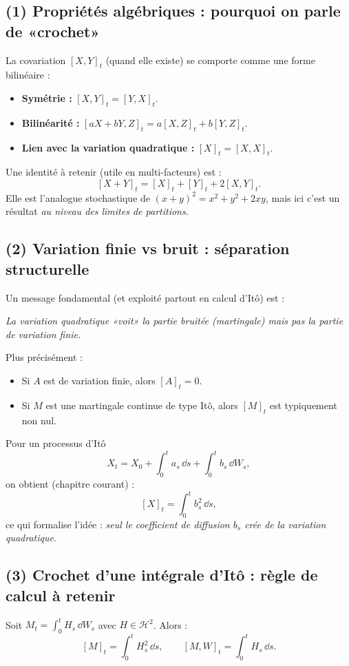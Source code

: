 
\subsection*{(1) Propriétés algébriques : pourquoi on parle de «crochet»}
La covariation $[X,Y]_t$ (quand elle existe) se comporte comme une forme bilinéaire :
\begin{itemize}[leftmargin=*]
\item \textbf{Symétrie :} $[X,Y]_t=[Y,X]_t$.
\item \textbf{Bilinéarité :} $[aX+bY,Z]_t=a[X,Z]_t+b[Y,Z]_t$.
\item \textbf{Lien avec la variation quadratique :} $[X]_t=[X,X]_t$.
\end{itemize}
Une identité à retenir (utile en multi-facteurs) est :
\[
[X+Y]_t=[X]_t+[Y]_t+2[X,Y]_t.
\]
Elle est l'analogue stochastique de $(x+y)^2=x^2+y^2+2xy$, mais ici c'est un résultat \emph{au niveau des limites de partitions}.

\subsection*{(2) Variation finie vs bruit : séparation structurelle}
Un message fondamental (et exploité partout en calcul d'Itô) est :
\begin{center}
\emph{La variation quadratique «voit» la partie bruitée (martingale) mais pas la partie de variation finie.}
\end{center}
Plus précisément :
\begin{itemize}[leftmargin=*]
\item Si $A$ est de variation finie, alors $[A]_t=0$.
\item Si $M$ est une martingale continue de type Itô, alors $[M]_t$ est typiquement non nul.
\end{itemize}
Pour un processus d'Itô
\[
X_t=X_0+\int_0^t a_s\,\dd s+\int_0^t b_s\,\dd W_s,
\]
on obtient (chapitre courant) :
\[
[X]_t=\int_0^t b_s^2\,\dd s,
\]
ce qui formalise l'idée : \emph{seul le coefficient de diffusion $b_s$ crée de la variation quadratique}.

\subsection*{(3) Crochet d'une intégrale d'Itô : règle de calcul à retenir}
Soit $M_t=\int_0^t H_s\,\dd W_s$ avec $H\in\mathcal{H}^2$.
Alors :
\[
[M]_t=\int_0^t H_s^2\,\dd s,
\qquad
[M,W]_t=\int_0^t H_s\,\dd s.
\]
